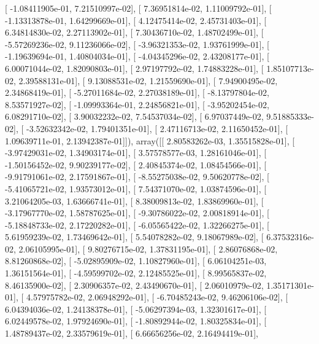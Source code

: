 \documentclass{article}
\begin{document}
       [ -1.08411905e-01,   7.21510997e-02],
       [  7.36951814e-02,   1.11009792e-01],
       [ -1.13313878e-01,   1.64299669e-01],
       [  4.12475414e-02,   2.45731403e-01],
       [  6.34814830e-02,   2.27113902e-01],
       [  7.30436710e-02,   1.48702499e-01],
       [ -5.57269236e-02,   9.11236066e-02],
       [ -3.96321353e-02,   1.93761999e-01],
       [ -1.19639694e-01,   1.40804034e-01],
       [ -4.04345296e-02,   2.43208177e-01],
       [  6.00071044e-02,   1.82090803e-01],
       [  2.97197792e-02,   1.74883228e-01],
       [  1.85107713e-02,   2.39588131e-01],
       [  9.13088531e-02,   1.21559690e-01],
       [  7.94900495e-02,   2.34868419e-01],
       [ -5.27011684e-02,   2.27038189e-01],
       [ -8.13797804e-02,   8.53571927e-02],
       [ -1.09993364e-01,   2.24856821e-01],
       [ -3.95202454e-02,   6.08291710e-02],
       [  3.90032232e-02,   7.54537034e-02],
       [  6.97037449e-02,   9.51885333e-02],
       [ -3.52632342e-02,   1.79401351e-01],
       [  2.47116713e-02,   2.11650452e-01],
       [  1.09639711e-01,   2.13942387e-01]]), array([[  2.80583262e-03,   1.35515828e-01],
       [ -3.97429031e-02,   1.34903174e-01],
       [  3.57578577e-03,   1.28161046e-01],
       [ -1.50156452e-02,   9.90239177e-02],
       [  2.40845374e-02,   1.08454566e-01],
       [ -9.91791061e-02,   2.17591867e-01],
       [ -8.55275038e-02,   9.50620778e-02],
       [ -5.41065721e-02,   1.93573012e-01],
       [  7.54371070e-02,   1.03874596e-01],
       [  3.21064205e-03,   1.63666741e-01],
       [  8.38009813e-02,   1.83869960e-01],
       [ -3.17967770e-02,   1.58787625e-01],
       [ -9.30786022e-02,   2.00818914e-01],
       [ -5.18848733e-02,   2.17220282e-01],
       [ -6.05565422e-02,   1.32266275e-01],
       [  5.61959239e-02,   1.73469642e-01],
       [  5.54078282e-02,   9.18067989e-02],
       [  6.37532316e-02,   2.06105995e-01],
       [  9.80276715e-02,   1.37831195e-01],
       [  2.86076868e-02,   8.81260868e-02],
       [ -5.02895909e-02,   1.10827960e-01],
       [  6.06104251e-03,   1.36151564e-01],
       [ -4.59599702e-02,   2.12485525e-01],
       [  8.99565837e-02,   8.46135900e-02],
       [  2.30906357e-02,   2.43490670e-01],
       [  2.06010979e-02,   1.35171301e-01],
       [  4.57975782e-02,   2.06948292e-01],
       [ -6.70485243e-02,   9.46206106e-02],
       [  6.04394036e-02,   1.24138378e-01],
       [ -5.06297394e-03,   1.32301617e-01],
       [  6.02449578e-02,   1.97924690e-01],
       [ -1.80892944e-02,   1.80325834e-01],
       [  1.48789437e-02,   2.33579619e-01],
       [  6.66656256e-02,   2.16494419e-01],
\end{document}
